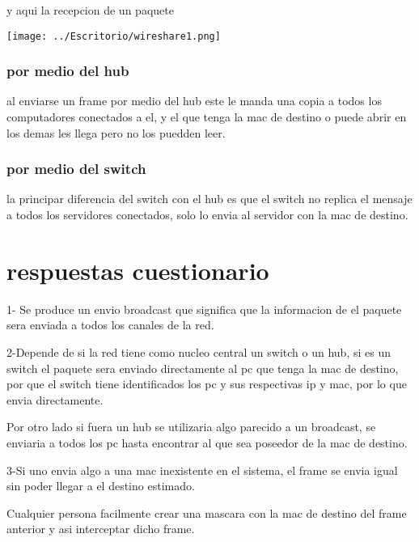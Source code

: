 \documentclass[11pt,a4paper]{report}
\begin{document}
y aqui la recepcion de un paquete 

\texttt{[image: ../Escritorio/wireshare1.png]}
\section{por medio del hub}
al enviarse un frame por medio del hub este le manda una copia a todos los computadores conectados a el, y el que tenga la mac de destino o puede abrir en los demas les llega pero no los puedden leer.

\section{por medio del switch}
la principar diferencia del switch con el hub es que el switch no replica el mensaje a todos los servidores conectados, solo lo envia al servidor con la mac de destino.
  
\part{respuestas cuestionario}
1- Se produce un envio broadcast que significa que la informacion de el paquete sera enviada a todos los canales de la red.

2-Depende de si la red tiene como nucleo central un switch o un hub, si es un switch el paquete sera enviado directamente al pc que tenga la mac de destino, por que el switch tiene identificados los pc y sus respectivas ip y mac, por lo que envia directamente.

Por otro lado si fuera un hub se utilizaria algo parecido a un broadcast, se enviaria a todos los pc hasta encontrar al que sea poseedor de la mac de destino.

3-Si uno envia algo a una mac inexistente en el sistema, el frame se envia igual sin poder llegar a el destino estimado.

Cualquier persona facilmente crear una mascara con la mac de destino del frame anterior y asi interceptar dicho frame.
  
\end{document}

